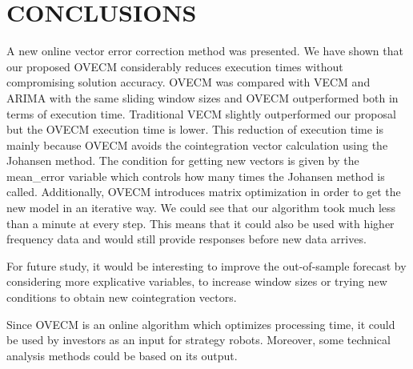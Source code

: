 \section{\uppercase{Conclusions}}
\label{sec:conclusions}
\noindent A new online vector error correction method was presented. 
We have shown that our proposed OVECM considerably reduces execution times
without compromising solution accuracy.  OVECM was compared with VECM and ARIMA
with the same sliding window sizes and OVECM outperformed both in terms of
execution time. Traditional VECM slightly outperformed our proposal but the
OVECM execution time is lower.
This reduction of execution time is mainly because OVECM avoids the cointegration vector
calculation using the Johansen method. The condition for getting new vectors is
given by the mean\_error variable which controls how many times the Johansen method is
called. Additionally, OVECM introduces matrix optimization in order to get the
new model in an iterative way.
We could see that our algorithm took much less than a minute at every
step. This means that it could also be used with higher frequency data and would
still provide responses before new data arrives.  

For future study, it would be interesting to improve the out-of-sample forecast
by considering more explicative variables, to increase window sizes or trying new
conditions to obtain new cointegration vectors. 

Since OVECM is an online algorithm which optimizes processing time, it could be
used by investors as an input for strategy robots. Moreover, some technical
analysis methods could be based on its output. 
